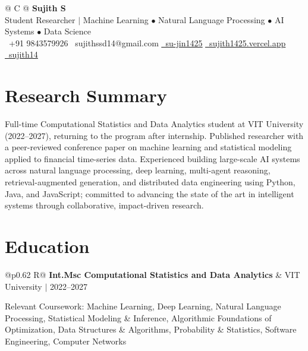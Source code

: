 \documentclass[a4paper,10pt]{article}
\newcommand{\ulink}[2]{\href{#1}{\uline{#2}}}
\newcommand{\subheading}[1]{{\color[HTML]{0A0A0A}\fontsize{12}{14}\selectfont\bfseries #1}}
\newcommand{\meta}[1]{{\color[HTML]{5C5C5C}\fontsize{10.5}{12.5}\selectfont #1}}
\begin{document}
\pagestyle{empty}

\begin{tabularx}{\linewidth}{@{} C @{}}
  {\color[HTML]{000000}\fontsize{30}{35}\selectfont\bfseries Sujith S} \\[5pt]
  {\fontsize{10.5}{12.5}\selectfont\color[HTML]{3A3A3A}Student Researcher $|$ Machine Learning $\bullet$ Natural Language Processing $\bullet$ AI Systems $\bullet$ Data Science} \\[7pt]
  {\fontsize{10.5}{12.5}\selectfont
    \textcolor[HTML]{3A3A3A}{%
    {}\ +91 9843579926
    \quad
    {\faEnvelope}\ sujithssd14@gmail.com
    \quad
    \ulink{https://github.com/su-jin1425}{{\faGithub}\ su-jin1425}
    \quad
    \ulink{https://sujith1425.vercel.app}{{\faGlobe}\ sujith1425.vercel.app}
    \quad
    \ulink{https://linkedin.com/in/sujith14}{{\faLinkedin}\ sujith14}
    }
}
\end{tabularx}

\vspace{3pt}

\section{Research Summary}
\vspace{2pt}
{\color[HTML]{0A0A0A}\fontsize{11}{15}\selectfont
Full-time Computational Statistics and Data Analytics student at VIT University (2022--2027), returning to the program after internship. Published researcher with a peer-reviewed conference paper on machine learning and statistical modeling applied to financial time-series data. Experienced building large-scale AI systems across natural language processing, deep learning, multi-agent reasoning, retrieval-augmented generation, and distributed data engineering using Python, Java, and JavaScript; committed to advancing the state of the art in intelligent systems through collaborative, impact-driven research.
}

\vspace{3pt}

\section{Education}
\vspace{3pt}

\begin{tabularx}{\linewidth}{@{}p{0.62\linewidth} R@{}}
  \subheading{Int.Msc Computational Statistics and Data Analytics} &
  \meta{VIT University $|$ 2022--2027}
\end{tabularx}
\vspace{2pt}
{\color[HTML]{3A3A3A}\fontsize{11}{15}\selectfont Relevant Coursework: Machine Learning, Deep Learning, Natural Language Processing, Statistical Modeling \& Inference, Algorithmic Foundations of Optimization, Data Structures \& Algorithms, Probability \& Statistics, Software Engineering, Computer Networks}
\end{document}
